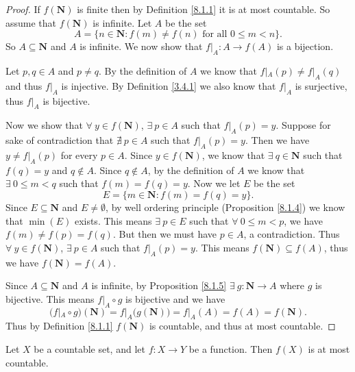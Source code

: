 \begin{proof}
    If \(f(\mathbf{N})\) is finite then by Definition \ref{8.1.1} it is at most countable.
    So assume that \(f(\mathbf{N})\) is infinite.
    Let \(A\) be the set
    \[
        A = \{n \in \mathbf{N} : f(m) \neq f(n) \text{ for all } 0 \leq m < n\}.
    \]
    So \(A \subseteq \mathbf{N}\) and \(A\) is infinite.
    We now show that \(f|_A : A \to f(A)\) is a bijection.

    Let \(p, q \in A\) and \(p \neq q\).
    By the definition of \(A\) we know that \(f|_A(p) \neq f|_A(q)\) and thus \(f|_A\) is injective.
    By Definition \ref{3.4.1} we also know that \(f|_A\) is surjective, thus \(f|_A\) is bijective.

    Now we show that \(\forall\ y \in f(\mathbf{N})\), \(\exists\ p \in A\) such that \(f|_A(p) = y\).
    Suppose for sake of contradiction that \(\nexists\ p \in A\) such that \(f|_A(p) = y\).
    Then we have \(y \neq f|_A(p)\) for every \(p \in A\).
    Since \(y \in f(\mathbf{N})\), we know that \(\exists\ q \in \mathbf{N}\) such that \(f(q) = y\) and \(q \notin A\).
    Since \(q \notin A\), by the definition of \(A\) we know that \(\exists\ 0 \leq m < q\) such that \(f(m) = f(q) = y\).
    Now we let \(E\) be the set
    \[
        E = \{m \in \mathbf{N} : f(m) = f(q) = y\}.
    \]
    Since \(E \subseteq \mathbf{N}\) and \(E \neq \emptyset\), by well ordering principle (Proposition \ref{8.1.4}) we know that \(\min(E)\) exists.
    This means \(\exists\ p \in E\) such that \(\forall\ 0 \leq m < p\), we have \(f(m) \neq f(p) = f(q)\).
    But then we must have \(p \in A\), a contradiction.
    Thus \(\forall\ y \in f(\mathbf{N})\), \(\exists\ p \in A\) such that \(f|_A(p) = y\).
    This means \(f(\mathbf{N}) \subseteq f(A)\), thus we have \(f(\mathbf{N}) = f(A)\).

    Since \(A \subseteq \mathbf{N}\) and \(A\) is infinite, by Proposition \ref{8.1.5} \(\exists\ g : \mathbf{N} \to A\) where \(g\) is bijective.
    This means \(f|_A \circ g\) is bijective and we have
    \[
        (f|_A \circ g)(\mathbf{N}) = f|_A\big(g(\mathbf{N})\big) = f|_A(A) = f(A) = f(\mathbf{N}).
    \]
    Thus by Definition \ref{8.1.1} \(f(\mathbf{N})\) is countable, and thus at most countable.
\end{proof}

\begin{corollary}\label{8.1.9}
    Let \(X\) be a countable set, and let \(f : X \to Y\) be a function.
    Then \(f(X)\) is at most countable.
\end{corollary}

